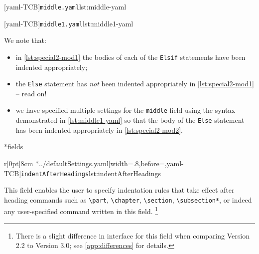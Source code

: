 	\begin{minipage}{.4\linewidth}
		[yaml-TCB]{\texttt{middle.yaml}}{lst:middle-yaml}
	\end{minipage}
	\hfill
	\begin{minipage}{.5\linewidth}
	\end{minipage}

	\begin{minipage}{.4\linewidth}
		[yaml-TCB]{\texttt{middle1.yaml}}{lst:middle1-yaml}
	\end{minipage}
	\hfill
	\begin{minipage}{.5\linewidth}
	\end{minipage}

	We note that: \begin{itemize} \item in \cref{lst:special2-mod1} the bodies of each of the \texttt{Elsif} statements have been indented appropriately;
		\item the \texttt{Else} statement has \emph{not} been indented appropriately in \cref{lst:special2-mod1} -- read on!
		\item we have specified multiple settings for the \texttt{middle} field using the syntax demonstrated in
		      \cref{lst:middle1-yaml} so that the body of the \texttt{Else} statement has been indented appropriately in \cref{lst:special2-mod2}.
	\end{itemize}

*{fields}
	\begin{wrapfigure}[17]{r}[0pt]{8cm}
		\cmhlistingsfromfile[style=indentAfterHeadings]*{../defaultSettings.yaml}[width=.8\linewidth,before=\centering,yaml-TCB]{\texttt{indentAfterHeadings}}{lst:indentAfterHeadings}
	\end{wrapfigure}
	This field enables the user to specify indentation rules that take effect after heading commands such as \lstinline!\part!, \lstinline!\chapter!, \lstinline!\section!, \lstinline!\subsection*!, or indeed any user-specified command written in this field.
	\footnote{There is a slight
		difference in interface for this field when comparing Version 2.2 to Version 3.0; see \vref{app:differences} for details.}

